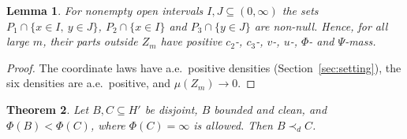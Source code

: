 \documentclass[11pt]{article}
\newtheorem{theorem}{Theorem}
\newtheorem{lemma}[theorem]{Lemma}
\theoremstyle{definition}\newtheorem{definition}[theorem]{Definition}
\theoremstyle{remark}\newtheorem{remark}[theorem]{Remark}
\begin{document}
\begin{lemma}\label{lem:cells}
For nonempty open intervals $I,J\subseteq(0,\infty)$ the sets
$P_1\cap\{x\in I,\ y\in J\}$, $P_2\cap\{x\in I\}$ and $P_3\cap\{y\in J\}$ are
non-null. Hence, for all large $m$, their parts outside $Z_m$ have positive
$c_2$-, $c_3$-, $v$-, $u$-, $\Phi$- and $\Psi$-mass.
\end{lemma}
\begin{proof}
The coordinate laws have a.e.\ positive densities (Section~\ref{sec:setting}),
the six densities are a.e.\ positive, and $\mu(Z_m)\to0$.
\end{proof}

\begin{theorem}\label{thm:debtprimary}
Let $B,C\subseteq H'$ be disjoint, $B$ bounded and clean, and
$\Phi(B)<\Phi(C)$, where $\Phi(C)=\infty$ is allowed. Then $B\prec_dC$.
\end{theorem}
\end{document}
